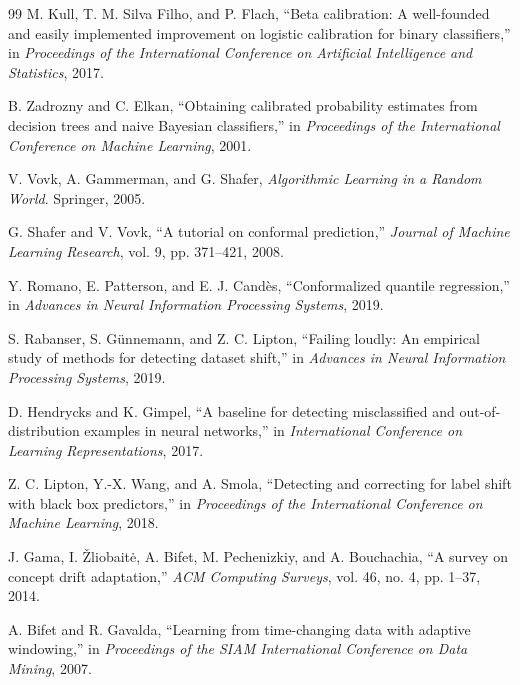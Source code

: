 \documentclass[10pt,conference]{IEEEtran}
\begin{document}
\begin{thebibliography}{99}
M. Kull, T. M. Silva Filho, and P. Flach, ``Beta calibration: A
well-founded and easily implemented improvement on logistic calibration
for binary classifiers,'' in \emph{Proceedings of the International
Conference on Artificial Intelligence and Statistics}, 2017.

B. Zadrozny and C. Elkan, ``Obtaining calibrated probability estimates
from decision trees and naive Bayesian classifiers,'' in \emph{Proceedings
of the International Conference on Machine Learning}, 2001.

V. Vovk, A. Gammerman, and G. Shafer, \emph{Algorithmic Learning in a
Random World}. Springer, 2005.

G. Shafer and V. Vovk, ``A tutorial on conformal prediction,''
\emph{Journal of Machine Learning Research}, vol. 9, pp. 371--421, 2008.

Y. Romano, E. Patterson, and E. J. Cand\`es, ``Conformalized quantile
regression,'' in \emph{Advances in Neural Information Processing Systems},
2019.

S. Rabanser, S. G\"unnemann, and Z. C. Lipton, ``Failing loudly: An
empirical study of methods for detecting dataset shift,'' in
\emph{Advances in Neural Information Processing Systems}, 2019.

D. Hendrycks and K. Gimpel, ``A baseline for detecting misclassified and
out-of-distribution examples in neural networks,'' in
\emph{International Conference on Learning Representations}, 2017.

Z. C. Lipton, Y.-X. Wang, and A. Smola, ``Detecting and correcting for
label shift with black box predictors,'' in \emph{Proceedings of the
International Conference on Machine Learning}, 2018.

J. Gama, I. \v{Z}liobait\.{e}, A. Bifet, M. Pechenizkiy, and
A. Bouchachia, ``A survey on concept drift adaptation,'' \emph{ACM
Computing Surveys}, vol. 46, no. 4, pp. 1--37, 2014.

A. Bifet and R. Gavalda, ``Learning from time-changing data with adaptive
windowing,'' in \emph{Proceedings of the SIAM International Conference on
Data Mining}, 2007.


\end{thebibliography}
\end{document}
